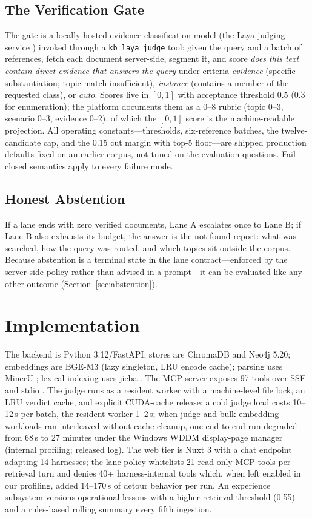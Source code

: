 \documentclass[journal]{IEEEtran}
\begin{document}
\subsection{The Verification Gate}
\label{sec:gate}
The gate is a locally hosted evidence-classification model (the Laya
judging service \cite{laya}) invoked through a \texttt{kb\_laya\_judge}
tool: given the query and a batch of references, fetch each document
server-side, segment it, and score \emph{does this text contain direct
evidence that answers the query} under criteria \emph{evidence}
(specific substantiation; topic match insufficient), \emph{instance}
(contains a member of the requested class), or \emph{auto}. Scores live
in $[0,1]$ with acceptance threshold 0.5 (0.3 for enumeration); the
platform documents them as a 0--8 rubric (topic 0--3, scenario 0--3,
evidence 0--2), of which the $[0,1]$ score is the machine-readable
projection. All operating constants---thresholds, six-reference batches,
the twelve-candidate cap, and the 0.15 cut margin with top-5 floor---are
shipped production defaults fixed on an earlier corpus, not tuned on the
evaluation questions. Fail-closed semantics apply to every failure mode.

\subsection{Honest Abstention}
If a lane ends with zero verified documents, Lane A escalates once to
Lane B; if Lane B also exhausts its budget, the answer is the not-found
report: what was searched, how the query was routed, and which topics sit
outside the corpus. Because abstention is a terminal state in the lane
contract---enforced by the server-side policy rather than advised in a
prompt---it can be evaluated like any other outcome
(Section~\ref{sec:abstention}).

\section{Implementation}
\label{sec:impl}
The backend is Python 3.12/FastAPI; stores are ChromaDB and Neo4j 5.20;
embeddings are BGE-M3 \cite{bge-m3} (lazy singleton, LRU encode cache);
parsing uses MinerU \cite{mineru}; lexical indexing uses jieba
\cite{jieba}. The MCP server exposes 97 tools over SSE and stdio
\cite{mcp}. The judge runs as a resident worker with a machine-level file
lock, an LRU verdict cache, and explicit CUDA-cache release: a cold judge
load costs 10--12\,s per batch, the resident worker 1--2\,s; when judge
and bulk-embedding workloads ran interleaved without cache cleanup, one
end-to-end run degraded from 68\,s to 27 minutes under the Windows WDDM
display-page manager (internal profiling; released log). The web tier is
Nuxt 3 with a chat endpoint adapting 14 harnesses; the lane policy
whitelists 21 read-only MCP tools per retrieval turn and denies 40+
harness-internal tools which, when left enabled in our profiling, added
14--170\,s of detour behavior per run. An experience subsystem versions
operational lessons with a higher retrieval threshold (0.55) and a
rules-based rolling summary every fifth ingestion.
\end{document}
